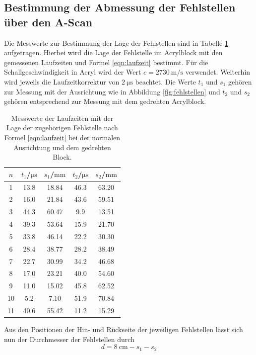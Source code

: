 \FloatBarrier
\subsection{Bestimmung der Abmessung der Fehlstellen über den A-Scan}
Die Messwerte zur Bestimmung der Lage der Fehlstellen sind in Tabelle \ref{tab:ascan}
aufgetragen. Hierbei wird die Lage der Fehlstelle im Acrylblock mit den gemessenen Laufzeiten
und Formel \eqref{eqn:laufzeit} bestimmt. Für die Schallgeschwindigkeit in Acryl wird der
Wert $c = \SI{2730}{\meter\per\second}$ verwendet. Weiterhin wird jeweils die Laufzeitkorrektur
von $\SI{2}{\micro\second}$ beachtet.
Die Werte $t_1$ und $s_1$ gehören zur Messung mit der Ausrichtung wie in Abbildung
\ref{fig:fehlstellen} und $t_2$ und $s_2$ gehören entsprechend zur Messung mit dem gedrehten 
Acrylblock.
\begin{table}
  \centering
	\caption{Messwerte der Laufzeiten mit der Lage der zugehörigen Fehlstelle nach Formel \eqref{eqn:laufzeit} bei der normalen Ausrichtung und dem gedrehten Block.}
	\label{tab:ascan}
	\begin{tabular}{ccccc}
		\toprule
		$n$ & $t_1$/$\si{\micro\second}$ & $s_1$/$\si{\milli\meter}$ & $t_2$/$\si{\micro\second}$ & $s_2$/$\si{\milli\meter}$ \\
		\midrule
		1 & 13.8 & 18.84 & 46.3 & 63.20 \\
		2 & 16.0 & 21.84 & 43.6 & 59.51 \\
		3 & 44.3 & 60.47 & 9.9 & 13.51 \\
		4 & 39.3 & 53.64 & 15.9 & 21.70 \\
		5 & 33.8 & 46.14 & 22.2 & 30.30 \\
		6 & 28.4 & 38.77 & 28.2 & 38.49 \\
		7 & 22.7 & 30.99 & 34.2 & 46.68 \\
		8 & 17.0 & 23.21 & 40.0 & 54.60 \\
		9 & 11.0 & 15.02 & 45.8 & 62.52 \\
		10 & 5.2 & 7.10 & 51.9 & 70.84 \\
		11 & 40.6 & 55.42 & 11.2 & 15.29 \\
		\bottomrule
	\end{tabular}
\end{table}
Aus den Positionen der Hin- und Rückseite der jeweiligen Fehlstellen lässt sich nun der
Durchmesser der Fehlstellen durch
\begin{equation*}
	d = \SI{8}{\centi\meter} - s_1 - s_2
\end{equation*}
